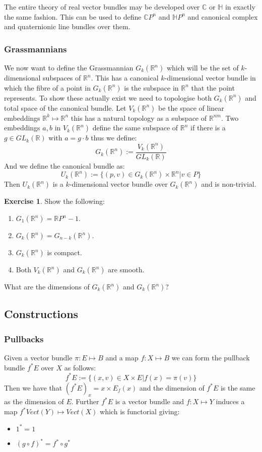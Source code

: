 \documentclass[a4paper,10pt]{article}
\theoremstyle{plain}%
\theoremstyle{definition}
\newtheorem{exer}{Exercise}
\theoremstyle{remark}
\newcommand{\RR}{\mathbb{R}}
\newcommand{\CC}{\mathbb{C}}
\newcommand{\HH}{\mathbb{H}}
\begin{document}
The entire theory of real vector bundles may be developed over $\CC$ or $\HH$ in exactly the same fashion. This can
be used to define $\CC P^n$ and $\HH P^n$ and canonical complex and quaternionic line bundles over them.

\subsubsection{Grassmannians}

We now want to define the Grassmannian $G_k(\RR^n)$ which will be the set of $k$-dimensional subspaces of $\RR^n$.
This has a canonical $k$-dimensional vector bundle in which the fibre of a point in $G_k(\RR^n)$ is the subspace 
in $\RR^n$ that the point represents. 
To show these actually exist we need to topologise both $G_k(\RR^n)$ and total space of the canonical bundle.
Let $V_k(\RR^n)$ be the space of linear embeddings $\RR^k\mapsto \RR^n$ this has a natural topology as a subspace of
$\RR^{n m}$. Two embeddings $a,b$ in $V_k(\RR^n)$ define the same subspace of $\RR^n$ if there is a $g\in GL_k(\RR)$
with $a=g\cdot b$ thus we define:
$$G_k(\RR^n):=\frac{V_k(\RR^n)}{GL_k(\RR)}$$
And we define the canonical bundle as:
$$U_k(\RR^n):=\{(p,v)\in G_k(\RR^n)\times \RR^n | v\in P\}$$
Then $U_k(\RR^n)$ is a $k$-dimensional vector bundle over $G_k(\RR^n)$ and is non-trivial.

\begin{exer}
Show the following:
 \begin{enumerate}
  \item $G_1(\RR^n)=\RR P^n-1$.
  \item $G_k(\RR^n) = G_{n-k}(\RR^n)$.
  \item $G_k(\RR^n)$ is compact.
  \item Both $V_k(\RR^n)$ and $G_k(\RR^n)$ are smooth.
 \end{enumerate}
What are the dimensions of $G_k(\RR^n)$ and $G_k(\RR^n)$?
\end{exer}

\subsection{Constructions}

\subsubsection{Pullbacks}

Given a vector bundle $\pi:E\mapsto B$ and a map $f:X\mapsto B$ we can form the pullback bundle
$f^\ast E$ over $X$ as follows:
$$f^\ast E := \{ (x,v) \in X\times E | f(x)=\pi(v)\}$$
Then we have that $(f^\ast E)_x=x\times E_f(x)$ and the dimension of $f^\ast E$ is the same as
the dimension of $E$. Further $f^\ast E$ is a vector bundle and $f:X\mapsto Y$ induces a map
$f^\ast Vect(Y)\mapsto Vect(X)$ which is functorial giving:
\begin{itemize}
 \item $1^\ast = 1$
 \item $(g\circ f)^\ast = f^\ast \circ g^\ast$
\end{itemize}
\end{document}
